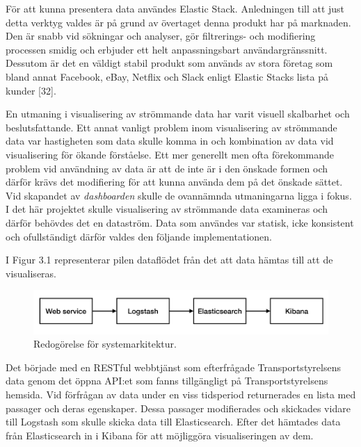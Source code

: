 \documentclass[12pt]{kththesis}
\begin{document}
För att kunna presentera data användes Elastic Stack. Anledningen till att just detta verktyg valdes är på grund av övertaget denna produkt har på marknaden. Den är snabb vid sökningar och analyser, gör filtrerings- och modifiering processen smidig och erbjuder ett helt anpassningsbart användargränssnitt. Dessutom är det en väldigt stabil produkt som används av stora företag som bland annat Facebook, eBay, Netflix och Slack enligt Elastic Stacks lista på kunder [32].  

En utmaning i visualisering av strömmande data har varit visuell skalbarhet och beslutsfattande. Ett annat vanligt problem inom visualisering av strömmande data var hastigheten som data skulle komma in och kombination av data vid visualisering för ökande förståelse. Ett mer generellt men ofta förekommande problem vid användning av data är att de inte är i den önskade formen och därför krävs det modifiering för att kunna använda dem på det önskade sättet. Vid skapandet av \textit{dashboarden} skulle de ovannämnda utmaningarna ligga i fokus. I det här projektet skulle visualisering av strömmande data examineras och därför behövdes det en dataström. Data som användes var statisk, icke konsistent och ofullständigt därför valdes den följande implementationen.

I Figur 3.1 representerar pilen dataflödet från det att data hämtas till att de visualiseras. 

\begin{figure}[h]
\centering
\includegraphics[width=1\textwidth]{Systemarkitektur}
\caption{Redogörelse för systemarkitektur.}
\end{figure}

Det började med en RESTful webbtjänst som efterfrågade Transportstyrelsens data genom det öppna API:et som fanns tillgängligt på Transportstyrelsens hemsida. Vid förfrågan av data under en viss tidsperiod returnerades en lista med passager och deras egenskaper. Dessa passager modifierades och skickades vidare till Logstash som skulle skicka data till Elasticsearch. Efter det hämtades data från Elasticsearch in i Kibana för att möjliggöra visualiseringen av dem.  
\end{document}
